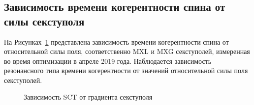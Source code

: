 \subsection{Зависимость времени когерентности спина от силы секступоля}
На Рисунках~\ref{fig:SCT_scan} представлена зависимость времени когерентности спина от относительной силы поля, соответственно MXL и MXG секступолей, измеренная во время оптимизации в апреле 2019 года. Наблюдается зависимость резонансного типа времени когерентности от значений относительной силы поля секступолей.

\begin{figure}[H]\centering
\end{figure}
\begin{figure}[H]\centering
	\caption{Зависимость SCT от градиента секступоля\label{fig:SCT_scan}}
\end{figure}

